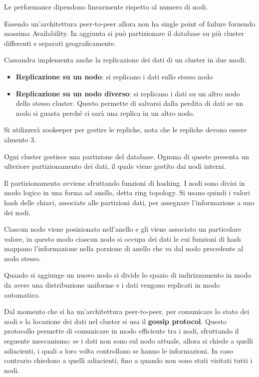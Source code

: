       Le performance dipendono linearmente rispetto al numero di nodi.

      Essendo un'architettura peer-to-peer allora non ha single point of failure
      fornendo massima Availability. In aggiunta si può partizionare il database
      su più cluster differenti e separati geograficamente.

      Cassandra implementa anche la replicazione dei dati di un cluster in due modi:
      \begin{itemize}
            \item \textbf{Replicazione su un nodo}: si replicano i dati sullo
                  stesso nodo
            \item \textbf{Replicazione su un nodo diverso}: si replicano i dati su un
                  altro nodo dello stesso cluster. Questo permette di salvarsi dalla
                  perdita di dati se un nodo si guasta perché ci sarà una replica in
                  un altro nodo.
      \end{itemize}
      Si utilizzerà zookeeper per gestire le repliche, nota che le repliche devono essere
      almento $3$.

      Ogni cluster gestisce una partizione del database. Ognuna di queste presenta
      un ulteriore partizionamento dei dati, il quale viene gestito dai nodi interni.

      Il partizionamento avviene sfruttando funzioni di hashing. I nodi sono divisi in
      modo logico in una forma ad anello, detta ring topology. Si usano quindi i valori
      hash delle chiavi, associate alle partizioni dati, per assegnare l'informazione
      a uno dei nodi.

      Ciascun nodo viene posizionato nell'anello e gli viene associato un particolare
      valore, in questo modo ciascun nodo si occupa dei dati le cui funzioni di hash
      mappano l'informazione nella porzione di anello che va dal nodo precedente al
      nodo stesso.

      Quando si aggiunge un nuovo nodo si divide lo spazio di indirizzamento in modo
      da avere una distribuzione uniforme e i dati vengono replicati in modo automatico.

      Dal momento che si ha un'architettura peer-to-peer, per comunicare lo stato
      dei nodi e la locazione dei dati nel cluster si usa il \textbf{gossip protocol}.
      Questo protocollo permette di comunicare in modo efficiente tra i nodi, sfruttando
      il seguente meccanismo: se i dati non sono sul nodo attuale, allora si chiede a
      quelli adiacienti, i quali a loro volta controllano se hanno le informazioni. In
      caso contrario chiedono a quelli adiacienti, fino a quando non sono stati visitati
      tutti i nodi.

